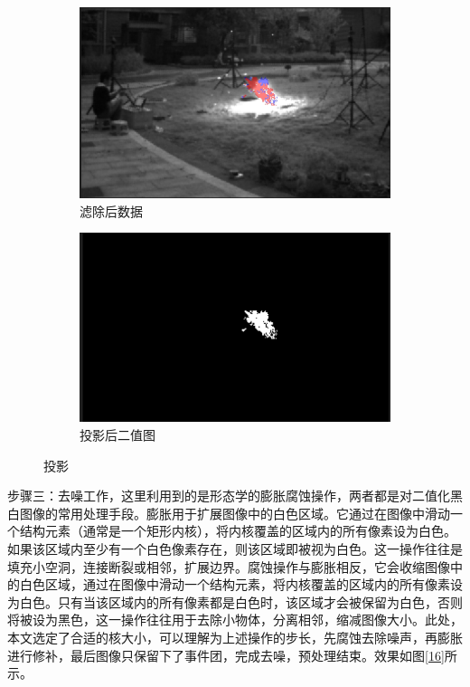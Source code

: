 \begin{figure}[ht]
    \centering
    \begin{subfigure}{0.49\textwidth}
        \centering
        \includegraphics[width=\textwidth]{figures/extract_process_02.png}
        \caption{滤除后数据}
        \label{15.a}
    \end{subfigure}
    \hfill
    \begin{subfigure}{0.49\textwidth}
        \centering
        \includegraphics[width=\textwidth]{figures/extract_process_03.png}
        \caption{投影后二值图}
        \label{15.b}
    \end{subfigure}
    \caption{投影}
    \label{15}
\end{figure}

步骤三：去噪工作，这里利用到的是形态学的膨胀腐蚀操作，两者都是对二值化黑白图像的常用处理手段。膨胀用于扩展图像中的白色区域。它通过在图像中滑动一个结构元素（通常是一个矩形内核），将内核覆盖的区域内的所有像素设为白色。如果该区域内至少有一个白色像素存在，则该区域即被视为白色。这一操作往往是填充小空洞，连接断裂或相邻，扩展边界。腐蚀操作与膨胀相反，它会收缩图像中的白色区域，通过在图像中滑动一个结构元素，将内核覆盖的区域内的所有像素设为白色。只有当该区域内的所有像素都是白色时，该区域才会被保留为白色，否则将被设为黑色，这一操作往往用于去除小物体，分离相邻，缩减图像大小。此处，本文选定了合适的核大小，可以理解为上述操作的步长，先腐蚀去除噪声，再膨胀进行修补，最后图像只保留下了事件团，完成去噪，预处理结束。效果如图\ref{16}所示。

